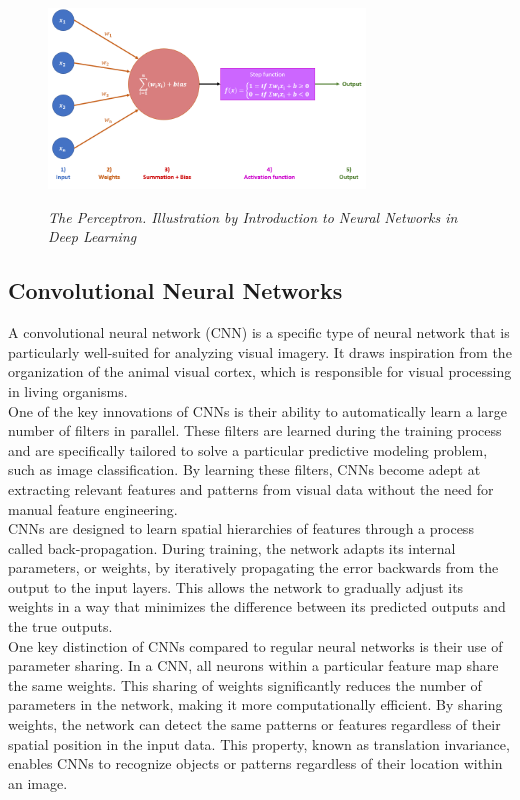 \begin{figure}[H]
\centering
\includegraphics[width=0.75\textwidth]{imatges/preliminaries/perceptron.png}
\caption[The Perceptron]{\textit{The Perceptron. Illustration by Introduction to Neural Networks in Deep Learning}}
{\label{fig:perceptron}}
\end{figure}


\subsection{Convolutional Neural Networks}

A convolutional neural network (CNN) is a specific type of neural network that is particularly well-suited for analyzing visual imagery. It draws inspiration from the organization of the animal visual cortex, which is responsible for visual processing in living organisms. \\

One of the key innovations of CNNs is their ability to automatically learn a large number of filters in parallel. These filters are learned during the training process and are specifically tailored to solve a particular predictive modeling problem, such as image classification. By learning these filters, CNNs become adept at extracting relevant features and patterns from visual data without the need for manual feature engineering. \\

CNNs are designed to learn spatial hierarchies of features through a process called back-propagation. During training, the network adapts its internal parameters, or weights, by iteratively propagating the error backwards from the output to the input layers. This allows the network to gradually adjust its weights in a way that minimizes the difference between its predicted outputs and the true outputs. \\

One key distinction of CNNs compared to regular neural networks is their use of parameter sharing. In a CNN, all neurons within a particular feature map share the same weights. This sharing of weights significantly reduces the number of parameters in the network, making it more computationally efficient. By sharing weights, the network can detect the same patterns or features regardless of their spatial position in the input data. This property, known as translation invariance, enables CNNs to recognize objects or patterns regardless of their location within an image.\\

